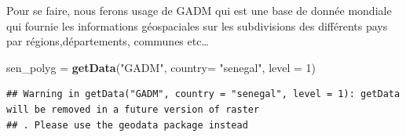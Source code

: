 \documentclass[
]{article}
\newenvironment{Shaded}{\begin{snugshade}}{\end{snugshade}}
\newcommand{\AttributeTok}[1]{\textcolor[rgb]{0.13,0.29,0.53}{#1}}
\newcommand{\DecValTok}[1]{\textcolor[rgb]{0.00,0.00,0.81}{#1}}
\newcommand{\FunctionTok}[1]{\textcolor[rgb]{0.13,0.29,0.53}{\textbf{#1}}}
\newcommand{\NormalTok}[1]{#1}
\newcommand{\OtherTok}[1]{\textcolor[rgb]{0.56,0.35,0.01}{#1}}
\newcommand{\StringTok}[1]{\textcolor[rgb]{0.31,0.60,0.02}{#1}}
\begin{document}
Pour se faire, nous ferons usage de GADM qui est une base de donnée
mondiale qui fournie les informations géospaciales sur les subdivisions
des différents pays par régions,départements, communes etc\ldots{}

\begin{Shaded}
\begin{Highlighting}[]
\NormalTok{sen\_polyg }\OtherTok{=} \FunctionTok{getData}\NormalTok{(}\StringTok{"GADM"}\NormalTok{, }\AttributeTok{country=} \StringTok{"senegal"}\NormalTok{, }\AttributeTok{level =} \DecValTok{1}\NormalTok{)}
\end{Highlighting}
\end{Shaded}

\begin{verbatim}
## Warning in getData("GADM", country = "senegal", level = 1): getData will be removed in a future version of raster
## . Please use the geodata package instead
\end{verbatim}
\end{document}
